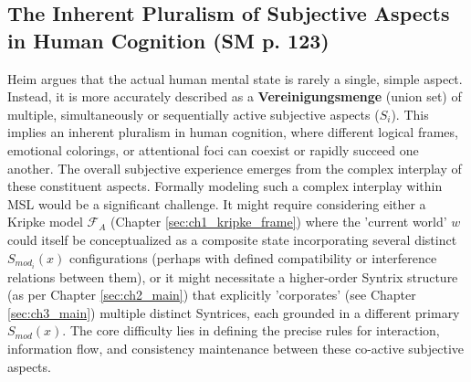 \documentclass[
    12pt,              %
    a4paper,           %
    headings=normal,   %
    twoside=true,      %
    BCOR=8mm,          %
]{scrbook}
\newcommand{\subjektiveraspekt}{S}
\begin{document}
\subsection{The Inherent Pluralism of Subjective Aspects in Human Cognition (SM p. 123)}
\label{sec:ch7_1_2_pluralism_human_aspects}
Heim argues that the actual human mental state is rarely a single, simple aspect. Instead, it is more accurately described as a \textbf{Vereinigungsmenge} (union set) of multiple, simultaneously or sequentially active subjective aspects (\(\subjektiveraspekt_i\)). This implies an inherent pluralism in human cognition, where different logical frames, emotional colorings, or attentional foci can coexist or rapidly succeed one another. The overall subjective experience emerges from the complex interplay of these constituent aspects.
Formally modeling such a complex interplay within MSL would be a significant challenge. It might require considering either a Kripke model \(\mathcal{F}_A\) (Chapter \ref{sec:ch1_kripke_frame}) where the 'current world' \(w\) could itself be conceptualized as a composite state incorporating several distinct \(S_{mod_i}(x)\) configurations (perhaps with defined compatibility or interference relations between them), or it might necessitate a higher-order Syntrix structure (as per Chapter \ref{sec:ch2_main}) that explicitly 'corporates' (see Chapter \ref{sec:ch3_main}) multiple distinct Syntrices, each grounded in a different primary \(S_{mod}(x)\). The core difficulty lies in defining the precise rules for interaction, information flow, and consistency maintenance between these co-active subjective aspects.
\end{document}

